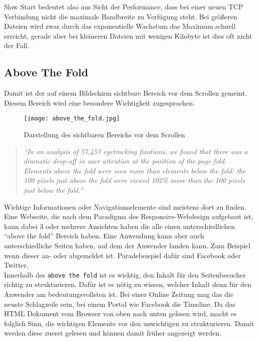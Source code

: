 		Slow Start bedeutet also aus Sicht der Performance, dass bei einer neuen TCP Verbindung nicht die maximale Bandbreite zu Verfügung steht. Bei größeren Dateien wird zwar durch das exponentielle Wachstum das Maximum schnell erreicht, gerade aber bei kleineren Dateien mit wenigen Kilobyte ist dies oft nicht der Fall.


	\subsection{Above The Fold} %
	\label{sub:above_the_fold}
		Damit ist der auf einem Bildschirm sichtbare Bereich vor dem Scrollen gemeint. Diesem Bereich wird eine besondere Wichtigkeit zugesprochen.
		\begin{figure}[htbp]
			\begin{center}
				\texttt{[image: above\_the\_fold.jpg]}
				\caption{Darstellung des sichtbaren Bereichs vor dem Scrollen}
				\label{fig:above_the_fold}
			\end{center}
		\end{figure}

		\begin{quote}
			 \textit{"`In an analysis of 57,453 eyetracking fixations, we found that there was a dramatic drop-off in user attention at the position of the page fold. Elements above the fold were seen more than elements below the fold: the 100 pixels just above the fold were viewed 102\% more than the 100 pixels just below the fold."'} \autocite{nng15}
		\end{quote}

		Wichtige Informationen oder Navigationselemente sind meistens dort zu finden. Eine Webseite, die nach dem Paradigma des Responsive-Webdesign aufgebaut ist, kann dabei 3 oder mehrere Ansichten haben die alle einen unterschiedlichen "`above the fold"' Bereich haben. Eine Anwendung kann aber auch unterschiedliche Seiten haben, auf dem der Anwender landen kann. Zum Beispiel wenn dieser an- oder abgemeldet ist. Paradebeispiel dafür sind Facebook oder Twitter.\\

		Innerhalb des \texttt{above the fold} ist es wichtig, den Inhalt für den Seitenbesucher richtig zu strukturieren. Dafür ist es nötig zu wissen, welcher Inhalt denn für den Anwender am bedeutungsvollsten ist. Bei einer Online Zeitung mag das die neuste Schlagzeile sein, bei einem Portal wie Facebook die Timeline. Da das HTML Dokument vom Browser von oben nach unten gelesen wird, macht es folglich Sinn, die wichtigen Elemente vor den unwichtigen zu strukturieren. Damit werden diese zuerst gelesen und können damit früher angezeigt werden.

